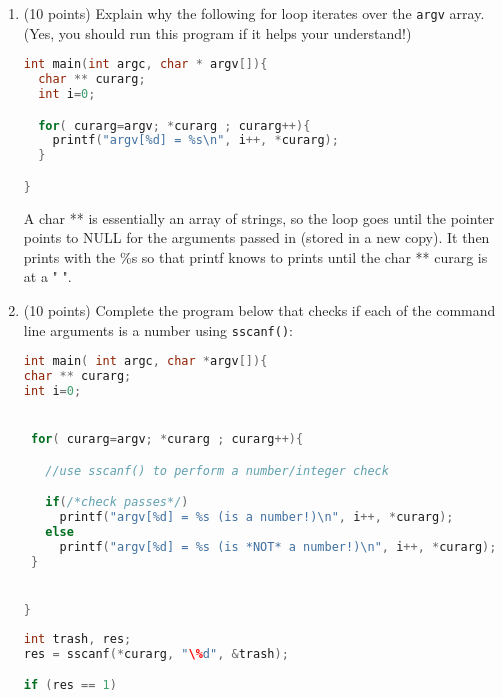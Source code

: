 \documentclass{article}[9pt]
\newenvironment{answerfont}{\fontfamily{qhv}\selectfont}{\par}
\newenvironment{myanswer}{\begin{mdframed}\begin{answerfont}}{\end{answerfont}\end{mdframed}}
\begin{document}
\begin{enumerate}
\item (10 points) Explain why the following for loop iterates over the \texttt{argv}
array. (Yes, you should run this program if it helps your
understand!)

\begin{lstlisting}[language=c]
int main(int argc, char * argv[]){
  char ** curarg;
  int i=0;

  for( curarg=argv; *curarg ; curarg++){
    printf("argv[%d] = %s\n", i++, *curarg);
  }

}
\end{lstlisting}

\begin{myanswer}
A char ** is essentially an array of strings, so the loop goes until the
pointer points to NULL for the arguments passed in (stored in a new
copy).  It then prints with the \%s so that printf knows to prints until
the char ** curarg is at a " ".
\end{myanswer}

\item (10 points) Complete the program below that checks if each of the
command line arguments is a number using \texttt{sscanf()}:

\begin{lstlisting}[language=c]
int main( int argc, char *argv[]){
char ** curarg;
int i=0;


 for( curarg=argv; *curarg ; curarg++){

   //use sscanf() to perform a number/integer check

   if(/*check passes*/)
     printf("argv[%d] = %s (is a number!)\n", i++, *curarg);
   else
     printf("argv[%d] = %s (is *NOT* a number!)\n", i++, *curarg);
 }


}
\end{lstlisting}

\begin{myanswer}
\begin{lstlisting}[language=c]
int trash, res;
res = sscanf(*curarg, "\%d", &trash);

if (res == 1)
\end{lstlisting}
\end{myanswer}


\end{enumerate}
\end{document}
